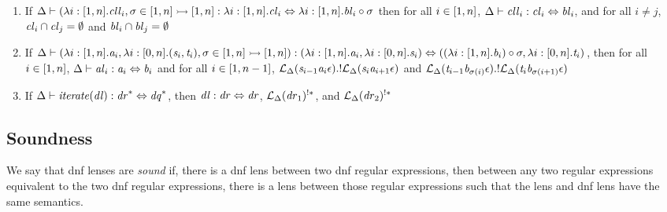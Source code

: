 \begin{lemma}
\label{lem:dnf-inversion}
\leavevmode
\begin{enumerate}
\item If $\Delta \vdash (\lambda i:[1,n].\mathit{cll}_i,\sigma \in [1,n] \rightarrowtail [1,n] : \lambda i:[1,n].\mathit{cl}_i \Leftrightarrow \lambda i:[1,n].\mathit{bl}_i \circ \sigma$
then for all $i \in [1,n]$, $\Delta \vdash \mathit{cll}_i : \mathit{cl}_i \Leftrightarrow \mathit{bl}_i$,
and for all $i \neq j$, $\mathit{cl}_i \cap \mathit{cl}_j = \emptyset$ and $\mathit{bl}_i \cap \mathit{bl}_j = \emptyset$
\item If $\Delta \vdash (\lambda i:[1,n].\mathit{a}_i,\lambda i:[0,n].(\mathit{s}_i,\mathit{t}_i),\sigma \in [1,n] \rightarrowtail [1,n]) : (\lambda i:[1,n].\mathit{a}_i,\lambda i:[0,n].\mathit{s}_i)\Leftrightarrow
((\lambda i:[1,n].\mathit{b}_i)\circ \sigma,\lambda i:[0,n].\mathit{t}_i)$, then for all
$i \in [1,n]$, $\Delta \vdash \mathit{al}_i : \mathit{a}_i \Leftrightarrow \mathit{b}_i$ and for all
$i \in [1,n-1]$, 
$\mathcal{L}_{\Delta}(\mathit{s}_{i-1}\mathit{a}_i\epsilon) .! \mathcal{L}_{\Delta}(\mathit{s}_i\mathit{a}_{i+1}\epsilon)$ and
$\mathcal{L}_{\Delta}(\mathit{t}_{i-1}\mathit{b}_{\sigma(i)}\epsilon) .! \mathcal{L}_{\Delta}(\mathit{t}_i\mathit{b}_{\sigma(i+1)}\epsilon)$
\item If $\Delta \vdash \mathit{iterate(\mathit{dl})} : \mathit{dr}^* \Leftrightarrow \mathit{dq}^*$, then
$\mathit{dl} : \mathit{dr} \Leftrightarrow \mathit{dr}$,
$\mathcal{L}_{\Delta}(\mathit{dr}_1)^{!*}$,
 and $\mathcal{L}_{\Delta}(\mathit{dr}_2)^{!*}$
\end{enumerate}
\end{lemma}

\subsection{Soundness}
We say that dnf lenses are \textit{sound} if, there is a dnf lens between two
dnf regular expressions, then between any two regular expressions equivalent
to the two dnf regular expressions, there is a lens between those regular
expressions such that the lens and dnf lens have the same semantics.

